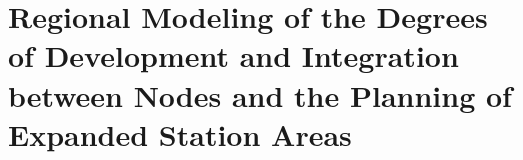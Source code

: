 
\chapter
{Regional Modeling of the Degrees of Development and Integration between Nodes and the Planning of Expanded Station Areas
    \label{chap6:titre}
    }
    \begin{refsegment}



\end{refsegment}
